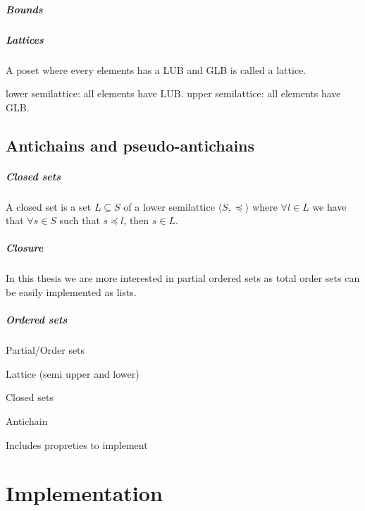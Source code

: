 \documentclass[letterpaper]{memoir}
\begin{document}
\paragraph{Bounds}

\paragraph{Lattices}

A poset where every elements has a LUB and GLB is called a lattice.

lower semilattice: all elements have LUB.
upper semilattice: all elements have GLB.


\section{Antichains and pseudo-antichains}

\paragraph{Closed sets}

A closed set is a set $L \subseteq S$
of a lower semilattice $\langle S, \preceq \rangle$
where $\forall l \in L$ we have that $\forall s \in S$ such that
$s \preceq l$, then $s \in L$.

\paragraph{Closure}




In this thesis we are more interested in partial ordered sets as
total order sets can be easily implemented as lists.

\paragraph{Ordered sets}

Partial/Order sets

Lattice (semi upper and lower)

Closed sets

Antichain

Includes propreties to implement



\chapter{Implementation}
\end{document}
